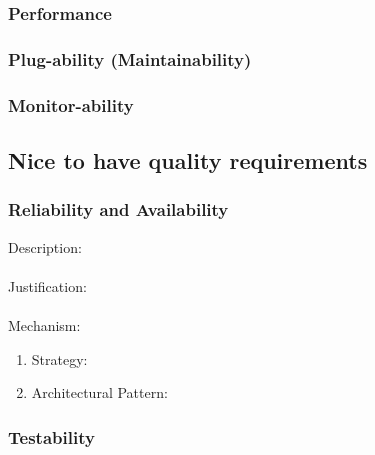 \documentclass[a4paper,12pt,titlepage]{article}
\begin{document}
\subsubsection{Performance}%
	
	\newpage
\subsubsection{Plug-ability (Maintainability)}%
	
\newpage
\subsubsection{Monitor-ability}%

\newpage
\subsection{Nice to have quality requirements}
\subsubsection{Reliability and Availability}%
	Description: \\\\
	Justification: \\\\
	Mechanism:
	\begin{enumerate}
		\item Strategy: 
		\item Architectural Pattern:
	\end{enumerate}
\subsubsection{Testability}%

\newpage
\end{document}
